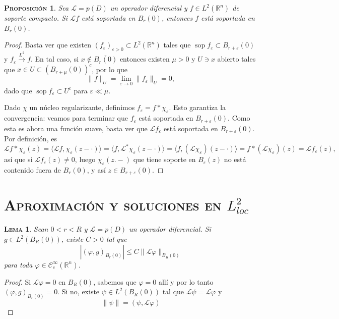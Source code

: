 \documentclass[11pt]{article}
\theoremstyle{colored}
\DeclareMathOperator{\sop}{sop}
\newtheorem{proposition}{\scshape Proposición}
\newtheorem{lemma}{\scshape Lema}
\newcommand{\R}{\mathbb{R}}
\newcommand{\C}{\mathscr{C}}
\newcommand{\eps}{\varepsilon}
\newcommand{\ev}[1]{\langle #1 \rangle}
\renewcommand{\L}{\mathscr{L}}
\begin{document}
\begin{proposition}Sea $\L = p(D)$ un operador diferencial y $f \in L^2(\R^n)$ de soporte compacto. Si $\L f$ está soportada en $B_r(0)$, entonces $f$ está soportada en $B_r(0)$.
\end{proposition}
\begin{proof} Basta ver que existen $(f_\eps)_{\eps > 0} \subset L^2(\R^n)$ tales que $\sop f_\eps \subset B_{r+\eps}(0)$ y $f_\eps \xrightarrow{L^2} f$. En tal caso, si $x \not \in \overline{B_r(0)}$ entonces existen $\mu > 0$ y $U \ni x $ abierto tales que $x \in U \subset (B_{r+\mu}(0))^c$, por lo que
\[
\|f\|_U = \lim_{\eps \to 0}\|f_\eps\|_U = 0,
\]
dado que $\sop f_\eps \subset U^c$ para $\eps \ll \mu$.

Dado $\chi$ un núcleo regularizante, definimos $f_\eps = f \ast \chi_\eps$. Esto garantiza la convergencia: veamos para terminar que $f_\eps$ está soportada en $B_{r+\eps}(0)$. Como esta es ahora una función suave, basta ver que $\L f_\eps$ está soportada en $B_{r+\eps}(0)$. Por definición, es
\[
\L f \ast \chi_\eps(z) = \ev{\L f,\chi_\eps(z-\cdot)} = \ev{f,\L^\ast\chi_\eps(z-\cdot)} = \ev{f,(\L\chi_\eps)(z-\cdot)} = f \ast (\L \chi_\eps
)(z) = \L f_\eps(z),
\]
así que si $\L f_\eps(z) \neq 0$, luego $\chi_\eps(z. -)$ que tiene soporte en $B_\eps(z)$ no está contenido fuera de $B_r(0)$, y así $z \in B_{r+\eps}(0)$.

\end{proof}

\section{\scshape Aproximación y soluciones en $L^2_{loc}$}

\begin{lemma} Sean $0 < r < R$ y $\L = p(D)$ un operador diferencial. Si $g \in L^2(B_R(0))$, existe $C > 0$ tal que
\[
|(\varphi,g)_{B_r(0)}| \leq C\|\L \varphi\|_{B_R(0)}
\]
para toda $\varphi \in \C_c^\infty(\R^n)$.
\end{lemma}
\begin{proof} Si $\L \varphi = 0$ en $B_R(0)$, sabemos que $\varphi = 0$ allí y por lo tanto $(\varphi,g)_{B_r(0)} = 0$. Si no, existe $\psi \in L^2(B_R(0))$ tal que $\L \psi = \L \varphi$ y 
\[
\|\psi\| = (\psi,\L \varphi)
\]
\end{proof}
\end{document}
